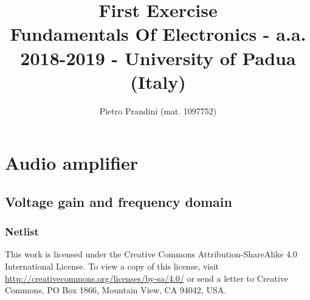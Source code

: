 \documentclass[10pt,a4paper]{article}
\title{First Exercise\\{\small{Fundamentals Of Electronics - a.a. 2018-2019 - University of Padua (Italy)}}}
\author{Pietro Prandini (mat. 1097752)}
\begin{document}
\maketitle
\section{Audio amplifier}
\subsection{Voltage gain and frequency domain}
\subsubsection{Netlist}


%

\vspace*{\fill}
\centering
\tiny{This work is licensed under the Creative Commons Attribution-ShareAlike 4.0 International License. To view a copy of this license, visit \href{http://creativecommons.org/licenses/by-sa/4.0/}{http://creativecommons.org/licenses/by-sa/4.0/} or send a letter to Creative Commons, PO Box 1866, Mountain View, CA 94042, USA.}
\end{document}
